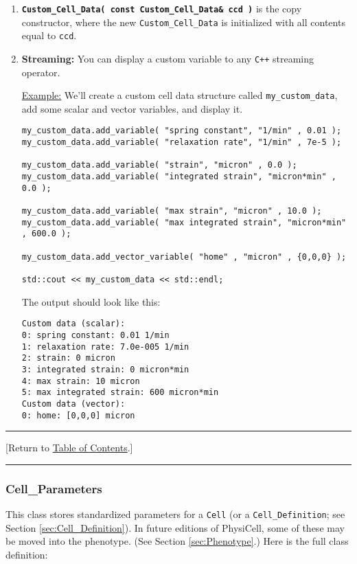 \documentclass[12pt]{article}
\renewcommand{\v}{\verb}
\newcommand{\smallcode}[1]{\textbf{\texttt{#1}}}
\newcommand{\TOClink}{\begin{center}\hrule\vskip-10pt\phantom{.}\hfill[Return to \hyperlink{TOC}{Table of Contents}.]\hfill\phantom{.}\vskip3pt\hrule\end{center}}
\begin{document}
\begin{enumerate}
\item 
\smallcode{Custom\_Cell\_Data( const Custom\_Cell\_Data\& ccd )} is the 
copy constructor, where the new \v|Custom_Cell_Data| is initialized 
with all contents equal to \v|ccd|. 
 
\item 
\textbf{Streaming:} You can display a custom variable to any 
\v|C++| streaming operator. 

\underline{Example:} We'll create a custom cell data structure called \v|my_custom_data|, 
add some scalar and vector variables, and display it. 
\begin{verbatim}
my_custom_data.add_variable( "spring constant", "1/min" , 0.01 ); 
my_custom_data.add_variable( "relaxation rate", "1/min" , 7e-5 ); 

my_custom_data.add_variable( "strain", "micron" , 0.0 ); 
my_custom_data.add_variable( "integrated strain", "micron*min" , 0.0 ); 

my_custom_data.add_variable( "max strain", "micron" , 10.0 ); 
my_custom_data.add_variable( "max integrated strain", "micron*min" , 600.0 ); 

my_custom_data.add_vector_variable( "home" , "micron" , {0,0,0} ); 

std::cout << my_custom_data << std::endl; 
\end{verbatim}

The output should look like this: 

\begin{verbatim}
Custom data (scalar):
0: spring constant: 0.01 1/min
1: relaxation rate: 7.0e-005 1/min
2: strain: 0 micron
3: integrated strain: 0 micron*min
4: max strain: 10 micron
5: max integrated strain: 600 micron*min
Custom data (vector):
0: home: [0,0,0] micron 
\end{verbatim}

\end{enumerate}

\TOClink 

\subsubsection{Cell\_Parameters}
\label{sec:Cell_Parameters} 
This class stores standardized parameters for a \v|Cell| (or a 
\v|Cell_Definition|; see Section \ref{sec:Cell_Definition}). In 
future editions of PhysiCell, some of these may be moved into the 
phenotype. (See Section \ref{sec:Phenotype}.)  Here 
is the full class definition: 
\end{document}
